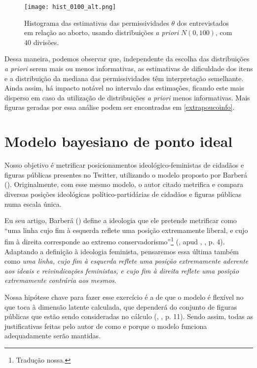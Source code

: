 \documentclass[
	12pt,				%
	openright,			%
	twoside,			%
	a4paper,			%
	english,			%
	brazil				%
	]{abntex2}
\begin{document}
 \begin{figure}[!htbp]
    \centering
    \texttt{[image: hist\_0100\_alt.png]}
    \caption{Histograma das estimativas das permissividades $\theta$ dos entrevistados em relação ao aborto, usando distribuições \textit{a priori} $N(0, 100)$, com 40 divisões.}
    \label{fig:thetas01b}
 \end{figure}
 
 Dessa maneira, podemos observar que, independente da escolha das distribuições \textit{a priori} serem mais ou menos informativas, as estimativas de dificuldade dos itens e a distribuição da mediana das permissividades têm interpretação semelhante. Ainda assim, há impacto notável no intervalo das estimações, ficando este mais disperso em caso da utilização de distribuições \textit{a priori} menos informativas. Mais figuras geradas por essa análise podem ser encontradas em \ref{extrapoucoinfo}.


 \chapter{Modelo bayesiano de ponto ideal}\label{modelobarberasecao}
 Nosso objetivo é metrificar posicionamentos ideológico-feministas de cidadãos e figuras públicas presentes no Twitter, utilizando o modelo proposto por Barberá (\citeyear{barbera2015}). Originalmente, com esse mesmo modelo, o autor citado metrifica e compara diversas posições ideológicas político-partidárias de cidadãos e figuras públicas numa escala única.

 Eu seu artigo, Barberá (\citeyear{barbera2015}) define a ideologia que ele pretende metrificar como ``uma linha cujo fim à esquerda reflete uma posição extremamente liberal, e cujo fim à direita corresponde ao extremo conservadorismo''\footnote{Tradução nossa.} (, \citeyear{bafumi2005} apud , \citeyear{barbera2015}, p. 4). Adaptando a definição à ideologia feminista, pensaremos essa última também como \emph{uma linha, cujo fim à esquerda reflete uma posição extremamente aderente aos ideais e reivindicações feministas, e cujo fim à direita reflete uma posição extremamente contrária aos mesmos}.

 Nossa hipótese chave para fazer esse exercício é a de que o modelo é flexível no que toca à dimensão latente calculada, que dependerá do conjunto de figuras públicas que estão sendo consideradas no cálculo (, \citeyear{barbera2015}, p. 11). Sendo assim, todas as justificativas feitas pelo autor de como e porque o modelo funciona adequadamente serão mantidas.
\end{document}
